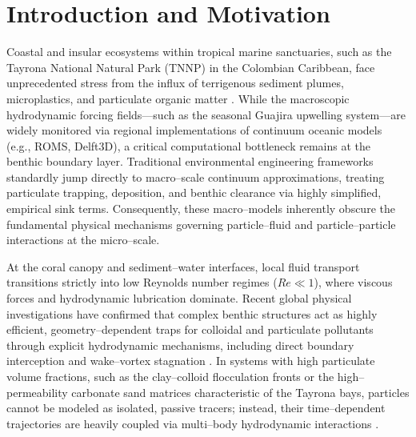 \section{Introduction and Motivation}
\label{sec:intro}

Coastal and insular ecosystems within tropical marine sanctuaries, such as the Tayrona National Natural Park (TNNP) in the Colombian Caribbean, face unprecedented stress from the influx of terrigenous sediment plumes, microplastics, and particulate organic matter \cite{bayraktarov2014physical, montoya2018seasonal}. While the macroscopic hydrodynamic forcing fields---such as the seasonal Guajira upwelling system---are widely monitored via regional implementations of continuum oceanic models (e.g., ROMS, Delft3D), a critical computational bottleneck remains at the benthic boundary layer. Traditional environmental engineering frameworks standardly jump directly to macro--scale continuum approximations, treating particulate trapping, deposition, and benthic clearance via highly simplified, empirical sink terms. Consequently, these macro--models inherently obscure the fundamental physical mechanisms governing particle--fluid and particle--particle interactions at the micro--scale.

At the coral canopy and sediment--water interfaces, local fluid transport transitions strictly into low Reynolds number regimes ($Re \ll 1$), where viscous forces and hydrodynamic lubrication dominate. Recent global physical investigations have confirmed that complex benthic structures act as highly efficient, geometry--dependent traps for colloidal and particulate pollutants through explicit hydrodynamic mechanisms, including direct boundary interception and wake--vortex stagnation \cite{mendrik2024microplastic}. In systems with high particulate volume fractions, such as the clay--colloid flocculation fronts or the high--permeability carbonate sand matrices characteristic of the Tayrona bays, particles cannot be modeled as isolated, passive tracers; instead, their time--dependent trajectories are heavily coupled via multi--body hydrodynamic interactions \cite{brady1988stokesian}. 

